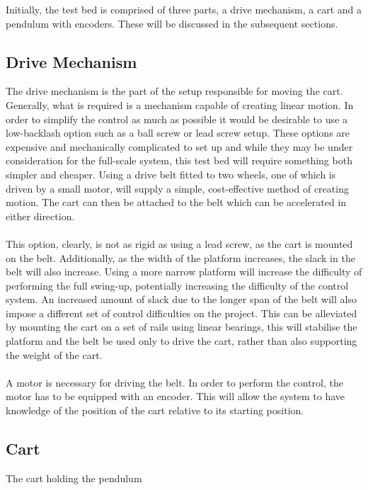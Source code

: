 Initially, the test bed is comprised of three parts, a drive mechanism, a cart and a pendulum with encoders.
These will be discussed in the subsequent sections.

\subsection{Drive Mechanism} %
\label{sub:drive_mechanism}
The drive mechanism is the part of the setup responsible for moving the cart.
Generally, what is required is a mechanism capable of creating linear motion.
In order to simplify the control as much as possible it would be desirable to use a low-backlash option such as a ball screw or lead screw setup.
These options are expensive and mechanically complicated to set up and while they may be under consideration for the full-scale system, this test bed will require something both simpler and cheaper.
Using a drive belt fitted to two wheels, one of which is driven by a small motor, will supply a simple, cost-effective method of creating motion.
The cart can then be attached to the belt which can be accelerated in either direction.
\\~\\
This option, clearly, is not as rigid as using a lead screw, as the cart is mounted on the belt.
Additionally, as the width of the platform increases, the slack in the belt will also increase.
Using a more narrow platform will increase the difficulty of performing the full swing-up, potentially increasing the difficulty of the control system.
An increased amount of slack due to the longer span of the belt will also impose a different set of control difficulties on the project.
This can be alleviated by mounting the cart on a set of rails using linear bearings, this will stabilise the platform and the belt be used only to drive the cart, rather than also supporting the weight of the cart.
\\~\\
A motor is necessary for driving the belt.
In order to perform the control, the motor has to be equipped with an encoder.
This will allow the system to have knowledge of the position of the cart relative to its starting position.


\subsection{Cart} %
\label{sub:cart}
The cart holding the pendulum 

